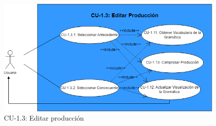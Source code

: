  \begin{figure}[H]
       \begin{center} 
 	\includegraphics[scale=0.55]{figuras/Cap7/CU13.png}
 	\caption{CU-1.3: Editar producción}
 	\label{fig:CU13}
       \end{center}
 \end{figure}


